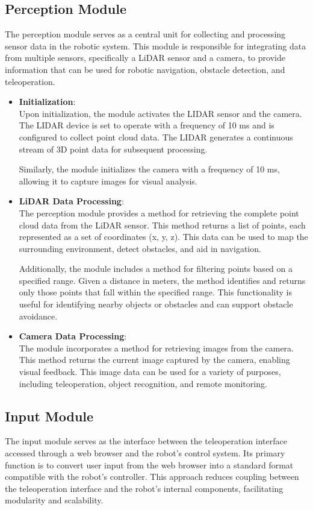 \documentclass{article}
\begin{document}
\subsection{Perception Module}
The perception module serves as a central unit for collecting and processing sensor data in the robotic system. This module is responsible for integrating data from multiple sensors, specifically a LiDAR sensor and a camera, to provide information that can be used for robotic navigation, obstacle detection, and teleoperation.
\begin{itemize}
    \item \textbf{Initialization}: \\
    Upon initialization, the module activates the LIDAR sensor and the camera. The LIDAR device is set to operate with a frequency of 10 ms and is configured to collect point cloud data. The LIDAR generates a continuous stream of 3D point data for subsequent processing.

    Similarly, the module initializes the camera with a frequency of 10 ms, allowing it to capture images for visual analysis.
    
    \item \textbf{LiDAR Data Processing}: \\
    The perception module provides a method for retrieving the complete point cloud data from the LiDAR sensor. This method returns a list of points, each represented as a set of coordinates (x, y, z). This data can be used to map the surrounding environment, detect obstacles, and aid in navigation.
    
    Additionally, the module includes a method for filtering points based on a specified range. Given a distance in meters, the method identifies and returns only those points that fall within the specified range. This functionality is useful for identifying nearby objects or obstacles and can support obstacle avoidance.
    
    \item \textbf{Camera Data Processing}: \\
    The module incorporates a method for retrieving images from the camera. This method returns the current image captured by the camera, enabling visual feedback. This image data can be used for a variety of purposes, including teleoperation, object recognition, and remote monitoring.
\end{itemize}

\subsection{Input Module}
The input module serves as the interface between the teleoperation interface accessed through a web browser and the robot's control system. Its primary function is to convert user input from the web browser into a standard format compatible with the robot's controller. This approach reduces coupling between the teleoperation interface and the robot's internal components, facilitating modularity and scalability.
\end{document}
